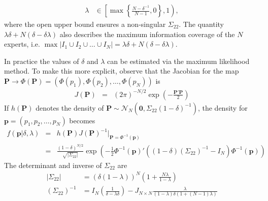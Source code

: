 \documentclass[11pt]{article}
\theoremstyle{definition}
\theoremstyle{definition}
\begin{document}
\begin{align}
\lambda &\in \left[  \max \left\{ \frac{N-\delta^{-1}}{N-1}, 0\right\}, 1 \right), \label{rhoDomain}
\end{align}
where the open upper bound ensures a non-singular $\Sigma_{22}$. The quantity  $\lambda\delta + N(\delta - \delta\lambda)$ also describes the maximum information coverage of the $N$ experts, i.e. $\max | I_1 \cup I_2 \cup \dots \cup I_N| = \lambda\delta + N(\delta - \delta\lambda)$. 

In practice the values of $\delta$ and $\lambda$ can be estimated via the maximum likelihood method. To make this more explicit, observe that the Jacobian for the map $\boldsymbol{P} \to \Phi\left(\boldsymbol{P}\right) = (\Phi(p_1), \Phi(p_2), \dots, \Phi(p_N))$ is
\begin{eqnarray*}
J(\boldsymbol{P}) &=& (2\pi)^{-N/2} \exp \left( - \frac{\boldsymbol{P}' \boldsymbol{P}}{2}   \right) 
\end{eqnarray*}
%
If $h(\boldsymbol{P})$ denotes the density of $\boldsymbol{P} \sim \mathcal{N}_N\left(\boldsymbol{0}, \Sigma_{22} (1-\delta)^{-1}\right)$,
the density for  $\boldsymbol{p} = (p_1, p_2, \dots, p_N)$ becomes
\begin{eqnarray*}
 f\left(\boldsymbol{p} | \delta, \lambda \right) &=& h(\boldsymbol{P}) J(\boldsymbol{P})^{-1} \bigg|_{\boldsymbol{P} = \Phi^{-1}(\boldsymbol{p})}\\
&=& \frac{(1-\delta)^{N/2}}{\sqrt{ \left|\Sigma_{22}\right|}} \exp\left( -\frac{1}{2} \Phi^{-1}(\boldsymbol{p})' \left( (1-\delta) \left(\Sigma_{22}\right)^{-1} - I_N \right) \Phi^{-1}(\boldsymbol{p})  \right) 
\end{eqnarray*}
The determinant and inverse of $\Sigma_{22}$ are
\begin{align}
\left| \Sigma_{22}\right| &= (\delta(1- \lambda))^N \left(1+\frac{N \lambda}{1 - \lambda} \right) \nonumber\\
\left(\Sigma_{22}\right)^{-1} &= I_N \left(\frac{1}{\delta-\lambda\delta} \right) - J_{N \times N} \frac{\lambda}{(1-\lambda)\delta(1+(N-1) \lambda)} \label{inverse}
\end{align}
\end{document}
